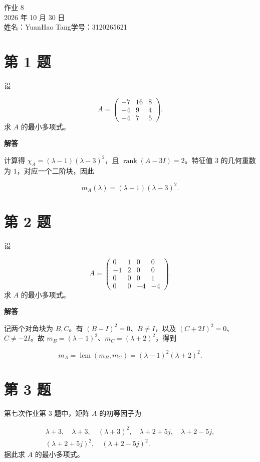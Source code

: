\documentclass[UTF8,10pt,letterpaper,fontset=fandol]{ctexart}
\begin{document}
\begin{center}
{\LARGE 作业 8}\\[0.6em]
2026 年 10 月 30 日\\[0.25em]
姓名：YuanHao Tang\quad 学号：3120265621
\end{center}

\section{第 1 题}
设

\[
A=\begin{pmatrix}-7&16&8\\-4&9&4\\-4&7&5\end{pmatrix}.
\]
求 $A$ 的最小多项式。

\par{}\textbf{解答}\par
计算得 $\chi_A=(\lambda-1)(\lambda-3)^2$，且 $\operatorname{rank}(A-3I)=2$。特征值 $3$ 的几何重数为 $1$，对应一个二阶块，因此

\[
\boxed{m_A(\lambda)=(\lambda-1)(\lambda-3)^2}.
\]

\section{第 2 题}
设

\[
A=\begin{pmatrix}0&1&0&0\\-1&2&0&0\\0&0&0&1\\0&0&-4&-4\end{pmatrix}.
\]
求 $A$ 的最小多项式。

\par{}\textbf{解答}\par
记两个对角块为 $B,C$。有 $(B-I)^2=0$、$B\ne I$，以及 $(C+2I)^2=0$、$C\ne-2I$。故 $m_B=(\lambda-1)^2$、$m_C=(\lambda+2)^2$，得到

\[
\boxed{m_A=\operatorname{lcm}(m_B,m_C)=(\lambda-1)^2(\lambda+2)^2}.
\]

\section{第 3 题}
第七次作业第 3 题中，矩阵 $A$ 的初等因子为

\[
\begin{gathered}
\lambda+3,\quad\lambda+3,\quad(\lambda+3)^2,\quad\lambda+2+5j,\quad\lambda+2-5j,\\
(\lambda+2+5j)^2,\quad(\lambda+2-5j)^2.
\end{gathered}
\]
据此求 $A$ 的最小多项式。
\end{document}
